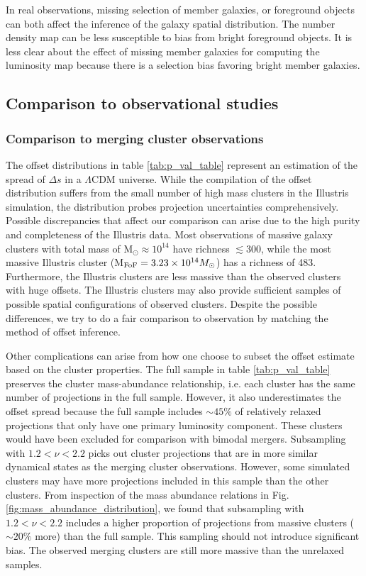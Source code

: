 In real observations, missing selection of member galaxies, or 
foreground objects can both affect the inference of the galaxy spatial 
distribution. The number density map can be less susceptible to bias from bright 
foreground objects. It is less clear about the effect of missing member galaxies 
for computing the luminosity map because there is a selection bias favoring 
bright member galaxies.

\subsection{Comparison to observational studies}

\subsubsection{Comparison to merging cluster observations}

The offset distributions in table \ref{tab:p_val_table}
represent an estimation of the spread of $\Delta s$ in a $\Lambda$CDM universe.
While the compilation of the offset distribution suffers 
from the small number of high mass clusters in the Illustris simulation, 
the distribution probes projection uncertainties comprehensively. 
Possible discrepancies that affect our comparison can arise
due to the high purity and completeness of the Illustris data.
Most observations of massive galaxy clusters with total mass of M$_\odot
\approx 10^{14}$ have richness $\lesssim 300$, while the most massive Illustris
cluster (M$_{\rm FoF} = 3.23 \times 10^{14} M_\odot$) has a richness of 483.
Furthermore, the Illustris clusters are less massive than the observed clusters
with huge offsets. The Illustris clusters may also provide sufficient samples
of possible spatial configurations of observed clusters.
Despite the possible differences, we try to do a
fair comparison to observation by matching the method of offset inference. 

Other complications can arise from how one choose to subset the offset estimate
based on the cluster properties.
The full sample in table \ref{tab:p_val_table} preserves the cluster mass-abundance
relationship, i.e. each cluster has the same number of projections in
the full sample. However, it also underestimates the offset spread because the
full sample includes $\sim 45\%$ of relatively relaxed projections 
that only have one primary luminosity component.  These clusters would
have been excluded for comparison with bimodal mergers. 
Subsampling with $1.2 < \nu < 2.2$ picks out
cluster projections that are in more similar dynamical states as the merging
cluster observations. 
However, some simulated clusters may have more projections included in this sample
than the other clusters. From inspection of the mass abundance relations in 
Fig. \ref{fig:mass_abundance_distribution}, we found that subsampling with $1.2 <
\nu <2.2$ includes a higher proportion of projections from massive clusters
($\sim 20\%$ more) than 
the full sample. This sampling should not introduce significant bias. 
The observed merging clusters are still more massive than the unrelaxed samples. 

